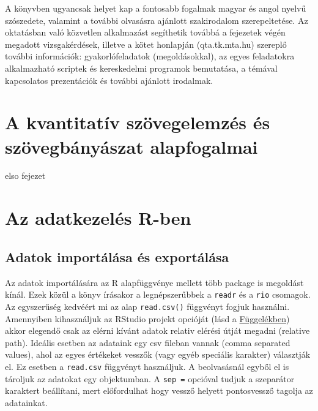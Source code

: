 \documentclass[
]{book}
\begin{document}
A könyvben ugyancsak helyet kap a fontosabb fogalmak magyar és angol
nyelvű szószedete, valamint a további olvasásra ajánlott szakirodalom
szerepeltetése. Az oktatásban való közvetlen alkalmazást segíthetik
továbbá a fejezetek végén megadott vizsgakérdések, illetve a kötet
honlapján (qta.tk.mta.hu) szereplő további információk:
gyakorlófeladatok (megoldásokkal), az egyes feladatokra alkalmazható
scriptek és kereskedelmi programok bemutatása, a témával kapcsolatos
prezentációk és további ajánlott irodalmak.

\hypertarget{a-kvantitatuxedv-szuxf6vegelemzuxe9s-uxe9s-szuxf6vegbuxe1nyuxe1szat-alapfogalmai}{%
\chapter{A kvantitatív szövegelemzés és szövegbányászat
alapfogalmai}\label{a-kvantitatuxedv-szuxf6vegelemzuxe9s-uxe9s-szuxf6vegbuxe1nyuxe1szat-alapfogalmai}}

elso fejezet

\hypertarget{az-adatkezeluxe9s-r-ben}{%
\chapter{Az adatkezelés R-ben}\label{az-adatkezeluxe9s-r-ben}}

\hypertarget{adatok-importuxe1luxe1sa-uxe9s-exportuxe1luxe1sa}{%
\section{Adatok importálása és
exportálása}\label{adatok-importuxe1luxe1sa-uxe9s-exportuxe1luxe1sa}}

Az adatok importálására az R alapfüggvénye mellett több package is
megoldást kínál. Ezek közül a könyv írásakor a legnépszerűbbek a
\texttt{readr} és a \texttt{rio} csomagok. Az egyszerűség kedvéért mi az
alap \texttt{read.csv()} függvényt fogjuk használni. Amennyiben
kihasználjuk az RStudio projekt opcióját (lásd a
\protect\hyperlink{projektmunka}{Függelékben}) akkor elegendő csak az
elérni kívánt adatok relativ elérési útját megadni (relative path).
Ideális esetben az adataink egy csv fileban vannak (comma separated
values), ahol az egyes értékeket vesszők (vagy egyéb speciális karakter)
választják el. Ez esetben a \texttt{read.csv} függvényt használjuk. A
beolvasásnál egyből el is tároljuk az adatokat egy objektumban. A
\texttt{sep\ =} opcióval tudjuk a szeparátor karaktert beállítani, mert
előfordulhat hogy vessző helyett pontosvessző tagolja az adatainkat.
\end{document}
